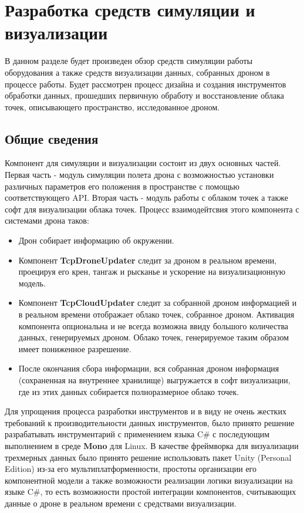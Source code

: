 \section{Разработка средств симуляции и визуализации}
\label{sec:simulation}

В данном разделе будет произведен обзор средств симуляции работы оборудования а также средств визуализации данных, собранных дроном в процессе работы. Будет рассмотрен процесс дизайна и создания инструментов обработки данных, прошедших первичную обработу и восстановление облака точек, описывающего пространство, исследованное дроном.

\subsection{Общие сведения}
\label{sub:simulation:general}

Компонент для симуляции и визуализации состоит из двух основных частей. Первая часть - модуль симуляции полета дрона с возможностью установки различных параметров его положения в пространстве с помощью соответствующего API. Вторая часть - модуль работы с облаком точек а также софт для визуализации облака точек. Процесс взаимодейтсвия этого компонента с системами дрона таков:
\begin{itemize}
\item Дрон собирает информацию об окружении.
\item Компонент \textbf{TcpDroneUpdater} следит за дроном в реальном времени, проецируя его крен, тангаж и рысканье и ускорение на визуализационную модель.
\item Компонент \textbf{TcpCloudUpdater} следит за собранной дроном информацией и в реальном времени отображает облако точек, собранное дроном. Активация компонента опциональна и не всегда возможна ввиду большого количества данных, генерируемых дроном. Облако точек, генерируемое таким образом имеет пониженное разрешение.
\item После окончания сбора информации, вся собранная дроном информация (сохраненная на внутреннее хранилище) выгружается в софт визуализации, где из этих данных собирается полноразмерное облако точек.
\end{itemize}

Для упрощения процесса разработки инструментов и в виду не очень жестких требований к производительности данных инструментов, было принято решение разрабатывать инструментарий с применением языка C\# с последующим выполнением в среде \textbf{Mono} для Linux. В качестве фреймворка для визуализации трехмерных данных было принято решение использовать пакет Unity (Personal Edition) из-за его мультиплатформенности, простоты организации его компонентной модели а также возможности реализации логики визуализации на языке C\#, то есть возможности простой интеграции компонентов, считывающих данные о дроне в реальном времени с средствами визуализации.

